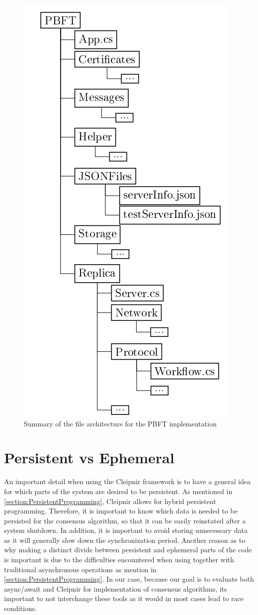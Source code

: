 \begin{figure}[H]
	\includegraphics[width=0.45\linewidth]{figures/filestructtest}
	\caption{Summary of the file architecture for the PBFT implementation}
    \label{fig:filestruct}
\end{figure}

\newpage

\section{Persistent vs Ephemeral}
\label{sec:persvsephe}
An important detail when using the Cleipnir framework is to have a general idea for which parts of the system are desired to be persistent. As mentioned in \autoref{section:PersistentProgramming}, Cleipnir allows for hybrid persistent programming. Therefore, it is important to know which data is needed to be persisted for the consensus algorithm, so that it can be easily reinstated after a system shutdown. In addition, it is important to avoid storing unnecessary data as it will generally slow down the synchronization period. Another reason as to why making a distinct divide between persistent and ephemeral parts of the code is important is due to the difficulties encountered when using  together with traditional asynchronous operations as mention in \autoref{section:PersistentProgramming}. In our case, because our goal is to evaluate both async/await and Cleipnir for implementation of consensus algorithms, its important to not interchange these tools as it would in most cases lead to race conditions.


